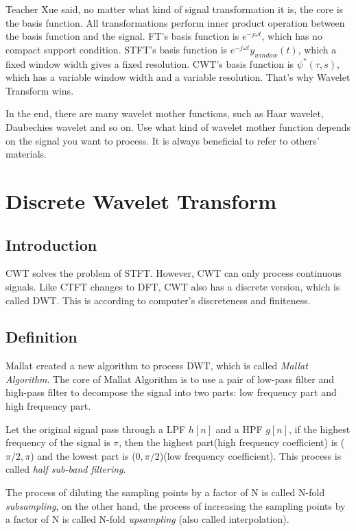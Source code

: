 \documentclass[10pt,a4paper,oneside,numbers=noenddot]{scrbook}
\theoremstyle{ctplain}
\theoremstyle{ctresult}
\begin{document}
Teacher Xue said, no matter what kind of signal transformation it is, the core is the
basis function. All transformations perform inner product operation between the basis
function and the signal. FT's basis function is $e^{-j\omega t}$, which has no compact
support condition. STFT's basis function is $e^{-j\omega t}y_{window}(t)$, which a fixed
window width gives a fixed resolution. CWT's basis function is $\psi^*(\tau,s)$, which has
a variable window width and a variable resolution. That's why Wavelet Transform wins.

In the end, there are many wavelet mother functions, such as Haar wavelet, Daubechies
wavelet and so on. Use what kind of wavelet mother function depends on the signal
you want to process. It is always beneficial to refer to others' materials.

\section{Discrete Wavelet Transform}

\subsection{Introduction}

CWT solves the problem of STFT. However, CWT can only process continuous signals.
Like CTFT changes to DFT, CWT also has a discrete version, which is called DWT.
This is according to computer's discreteness and finiteness.

\subsection{Definition}

Mallat created a new algorithm to process DWT, which is called \emph{Mallat Algorithm}.
The core of Mallat Algorithm is to use a pair of low-pass filter and high-pass filter
to decompose the signal into two parts: low frequency part and high frequency part.

Let the original signal pass through a LPF $h[n]$ and a HPF $g[n]$, if the highest
frequency of the signal is $\pi$, then the highest part(high frequency coefficient) is
($\pi/2, \pi$) and the lowest part is ($0, \pi/2$)(low frequency coefficient). This
process is called \emph{half sub-band filtering}.

The process of diluting the sampling points by a factor of N is called N-fold
\emph{subsampling}, on the other hand, the process of increasing the sampling points
by a factor of N is called N-fold \emph{upsampling} (also called interpolation).
\end{document}
